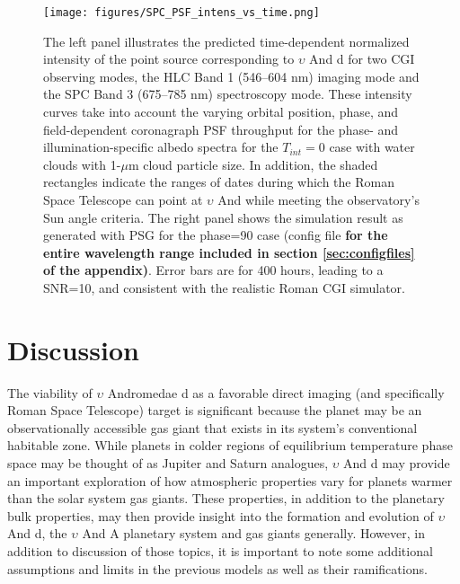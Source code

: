 \documentclass[12pt, letterpaper]{aastex631}
\begin{document}
\begin{figure*}[]
  \centering
  {\texttt{[image: figures/SPC\_PSF\_intens\_vs\_time.png]}}
  \caption{The left panel illustrates the predicted time-dependent normalized intensity of the point source corresponding to $\upsilon$ And d for two CGI observing modes, the HLC Band 1 (546--604 nm) imaging mode and the SPC Band 3 (675--785 nm) spectroscopy mode. These intensity curves take into account the varying orbital position, phase, and field-dependent coronagraph PSF throughput for the phase- and illumination-specific albedo spectra for the $T_{int}=0$ case with water clouds with 1-$\mu$m cloud particle size. In addition, the shaded rectangles indicate the ranges of dates during which the Roman Space Telescope can point at $\upsilon$ And while meeting the observatory's Sun angle criteria. The right panel shows the simulation result as generated with PSG for the phase=90 case (config file \textbf{for the entire wavelength range included in section \ref{sec:configfiles} of the appendix)}. Error bars are for 400 hours, leading to a SNR=10, and consistent with the realistic Roman CGI simulator.~\citep{Krist2016JATIS, 2019arXiv190104050B, Groff2020AAS} }
  \label{fig:RomanObservables}
\end{figure*}

\section{Discussion} \label{sec:Discussion}

The viability of $\upsilon$ Andromedae d as a favorable direct imaging (and specifically Roman Space Telescope) target is significant because the planet may be an observationally accessible gas giant that exists in its system's conventional habitable zone.  While planets in colder regions of equilibrium temperature phase space may be thought of as Jupiter and Saturn analogues, $\upsilon$ And d may provide an important exploration of how atmospheric properties vary for planets warmer than the solar system gas giants. These properties, in addition to the planetary bulk properties, may then provide insight into the formation and evolution of $\upsilon$ And d, the $\upsilon$ And A planetary system and gas giants generally. However, in addition to discussion of those topics, it is important to note some additional assumptions and limits in the previous models as well as their ramifications. 
\end{document}
